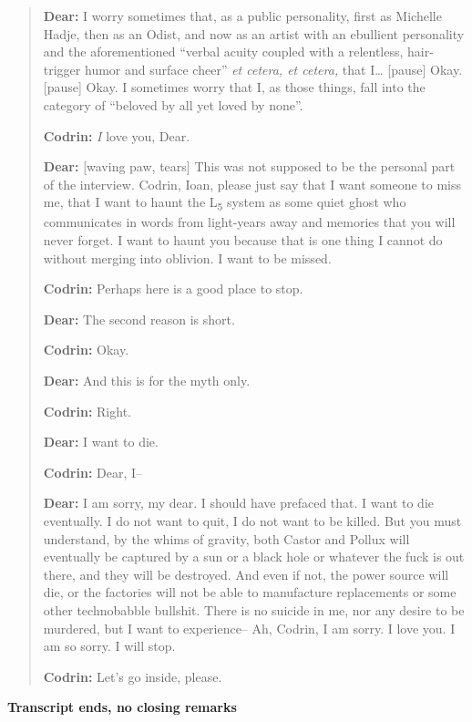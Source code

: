 \begin{quote}
\textbf{Dear:} I worry sometimes that, as a public personality, first as Michelle Hadje, then as an Odist, and now as an artist with an ebullient personality and the aforementioned ``verbal acuity coupled with a relentless, hair-trigger humor and surface cheer'' \emph{et cetera, et cetera,} that I\ldots{} {[}pause{]} Okay. {[}pause{]} Okay. I sometimes worry that I, as those things, fall into the category of ``beloved by all yet loved by none''.

\textbf{Codrin:} \emph{I} love you, Dear.

\textbf{Dear:} {[}waving paw, tears{]} This was not supposed to be the personal part of the interview. Codrin, Ioan, please just say that I want someone to miss me, that I want to haunt the L\textsubscript{5} system as some quiet ghost who communicates in words from light-years away and memories that you will never forget. I want to haunt you because that is one thing I cannot do without merging into oblivion. I want to be missed.

\textbf{Codrin:} Perhaps here is a good place to stop.

\textbf{Dear:} The second reason is short.

\textbf{Codrin:} Okay.

\textbf{Dear:} And this is for the myth only.

\textbf{Codrin:} Right.

\textbf{Dear:} I want to die.

\textbf{Codrin:} Dear, I--

\textbf{Dear:} I am sorry, my dear. I should have prefaced that. I want to die eventually. I do not want to quit, I do not want to be killed. But you must understand, by the whims of gravity, both Castor and Pollux will eventually be captured by a sun or a black hole or whatever the fuck is out there, and they will be destroyed. And even if not, the power source will die, or the factories will not be able to manufacture replacements or some other technobabble bullshit. There is no suicide in me, nor any desire to be murdered, but I want to experience-- Ah, Codrin, I am sorry. I love you. I am so sorry. I will stop.

\textbf{Codrin:} Let's go inside, please.
\end{quote}

\textbf{Transcript ends, no closing remarks}
